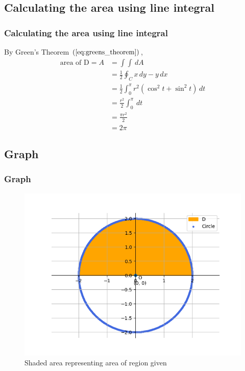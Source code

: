 \documentclass{beamer}
\providecommand{\brak}[1]{\ensuremath{\left(#1\right)}}
\theoremstyle{remark}
\numberwithin{equation}{section}
\begin{document}
\subsection{Calculating the area using line integral}
\begin{frame}
\frametitle{Calculating the area using line integral}

By Green's Theorem $\brak{\ref{eq:greens_theorem}}$,
\begin{align}
	\text{area of D}  = A &= \int \int \, dA\\
	&= \frac{1}{2} \oint_{C} x\, dy - y\, dx\\
	&= \frac{1}{2} \int_{0}^{\pi} r^2\brak{\cos^2{t} + \sin^2{t}} \, dt\\
	&= \frac{r^2}{2} \int_{0}^{\pi} \, dt\\
	&= \frac{\pi r^2}{2}\\
	&= 2\pi
\end{align}

\end{frame}

\subsection{Graph}
\begin{frame}
\frametitle{Graph}

\begin{figure}[h!]
   \centering
   \includegraphics[width=0.7\linewidth]{figs/graph.png}
   \caption{Shaded area representing area of region given}
\end{figure}

\end{frame}

\end{document}
